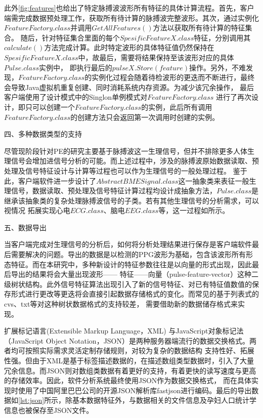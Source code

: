 此外\autoref{fig:features}也给出了特定脉搏波波形所有特征的具体计算流程。首先，客户端需完成数据预处理工作，获取所有待计算的脉搏波完整波形。其次，通过实例化$FeatureFactory.class$并调用$GetAllFeatures()$方法以获取所有待计算的特征集合。
随后，针对特征集合里面的每个$SpesificFeatureX.class$特征，分别调用其$calculate()$方法完成计算。此时特定波形的具体特征值仍然保持在$SpesificFeatureX.class$中，故最后，需要将结果保持至该波形对应的具体$Pulse.class$实例中，
即执行最后的$pulseX.Store(feature)$操作。另外，不难发现，$FeatureFactory.class$的实例化过程会随着待检波形的更迭而不断进行，最终会导致Java虚拟机重复创建、同时消耗系统内存资源。为减少该冗余操作，
最后客户端使用了设计模式中的Singlon单例模式\cite{Li2015}对$FeatureFactory.class$
进行了再次设计，即只可以创建一个$FeatureFactory.class$的实例，此后所有调用$FeatureFactory.class$的创建方法只会返回第一次调用时创建的实例。

四、多种数据类型的支持

尽管现阶段针对PE的研究主要基于脉搏波这一生理信号，但并不排除更多人体生理信号会增加进信号分析的可能。而上述过程中，涉及的脉搏波原始数据读取、预处理及信号特征设计与计算等过程也可以作为生理信号的一般处理过程。
鉴于此，客户端软件进一步设计了$AbstractBMESignal.class$这一抽象类来表征一般生理信号，数据读取、预处理及信号特征计算过程均设计成抽象方法，$Pulse.class$是继承该抽象类的复杂处理脉搏波信号的子类。若有其他生理信号的分析需求，可以视情况
拓展实现心电$ECG.class$、脑电$EEG.class$等，这一过程如所示。

五、数据导出

当客户端完成对生理信号的分析后，如何将分析处理结果进行保存是客户端软件最后需要解决的问题。导出的数据是以检测的PPG波形为基础，包含该波形所有形态特征。而在本研究中，多种新设计的特征参数往往是以向量的形式出现，因此最后导出的结果将会大量出现波形——
特征——向量（pulse-feature-vector）这种二级树状结构。此外信号特征算法出现引入了新的信号特征、对已有特征值数值的保存形式进行更改等更迭将会直接引起数据存储格式的变化。而常见的基于列表式的cvs、txt等对这种树状数据格式的支持较差，
需要借助新的数据储存格式来实现。

扩展标记语言(Extensible Markup Language，XML) \cite{xml,Li2016}与JavaScript对象标记法（JavaScript Object Notation，JSON）\cite{json,Crockford2006}是两种服务器端流行的数据交换格式。两者均可按照实际需求灵活定制存储规则，对较为复杂的数据结构
支持性好、拓展性强。但由于XML是基于标签描述数据的，在描述数组类型数据时，引入了大量冗余信息。而JSON则对数组类数据有着更好的支持，有着更快的读写速度与更高的存储效率\cite{Nurseitov2009}。因此，软件分析系统最终使用JSON作为数据交换格式，
而在具体实现时使用了中国阿里巴巴公司的开源JSON解析库fastjson\cite{fastjson}进行编码。最后的导出数据如\autoref{lst:json}所示，除基本数据特征外，与数据相关的文件信息及孕妇人口统计学信息也被保存至JSON文件。


